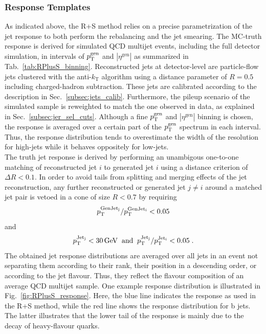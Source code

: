  \subsubsection*{Response Templates}
\label{subsubsec:qcd_response}
As indicated above, the R+S method relies on a precise parametrization of the jet response to both perform the rebalancing and the jet smearing. The MC-truth response is derived for simulated QCD multijet events, including the full detector simulation, in intervals of $p_{\text{T}}^\mathrm{gen}$ and $|\eta^\mathrm{gen}|$ as summarized in Tab.~\ref{tab:RPlusS_binning}. Reconstructed jets at detector-level are particle-flow jets clustered with the anti-$k_\mathrm{T}$ algorithm using a distance parameter of $R = 0.5$ including charged-hadron subtraction. These jets are calibrated according to the description in Sec.~\ref{subsec:jets_calib}. Furthermore, the pileup scenario of the simulated sample is reweighted to match the one observed in data, as explained in Sec.~\ref{subsec:jer_sel_cuts}. Although a fine $p_{\text{T}}^\mathrm{gen}$ and $|\eta^\mathrm{gen}|$ binning is chosen, the response is averaged over a certain part of the $p_{\text{T}}^\mathrm{gen}$ spectrum in each interval. Thus, the response distribution tends to overestimate the width of the resolution for high-\pt jets while it behaves oppositely for low-\pt jets. \\
The truth jet response is derived by performing an unambigous one-to-one matching of reconstructed jet $i$ to generated jet $i$ using a distance criterion of $\Delta R < 0.1$. In order to avoid tails from splitting and merging effects of the jet reconstruction, any further reconstructed or generated jet $j \ne i$ around a matched jet pair is vetoed in a cone of size $R < 0.7$ by requiring
\begin{equation}
 p_{\text{T}}^{\rm{GenJet}_j} / p_{\text{T}}^{\rm{GenJet}_i} < 0.05
\end{equation} 
and
\begin{equation}
 p_{\text{T}}^{\rm{Jet}_j} < 30\,\mathrm{GeV} \;\; \mathrm{and} \;\; p_{\text{T}}^{\rm{Jet}_j} / p_{\text{T}}^{\rm{Jet}_i} < 0.05 \; .
\end{equation} 
The obtained jet response distributions are averaged over all jets in an event not separating them according to their rank, \ie their position in a descending \pt order, or according to the jet flavour. Thus, they reflect the flavour composition of an average QCD multijet sample. One example response distribution is illustrated in Fig.~\ref{fig:RPlusS_response}. Here, the blue line indicates the response as used in the R+S method, while the red line shows the response distribution for b jets. The latter illustrates that the lower tail of the response is mainly due to the decay of heavy-flavour quarks.
